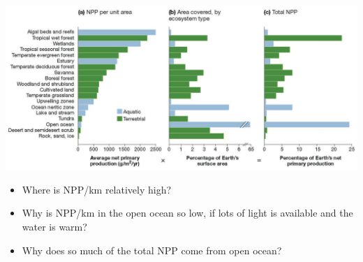 \begin{frame}[t]
    \begin{adjustwidth}{-2em}{-1.5em}
        \vspace{-3mm}
        \includegraphics[width=\linewidth]{productivity-by-ecosystems.png}

        \begin{itemize}
            \item Where is NPP/km relatively high?


            \item Why is NPP/km in the open ocean so low, if lots of
                light is available and the water is warm?


            \item Why does so much of the total NPP come from open ocean?

        \end{itemize}

    \end{adjustwidth}
\end{frame}

